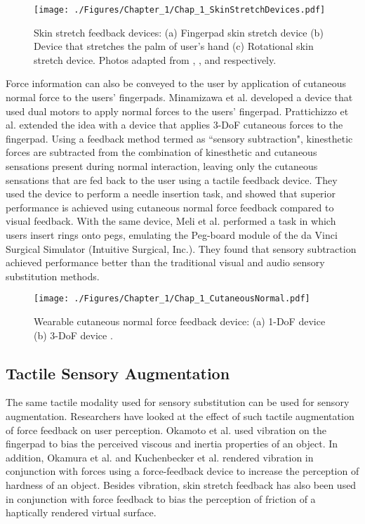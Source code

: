 \begin{figure*}[h]
\centering
\texttt{[image: ./Figures/Chapter\_1/Chap\_1\_SkinStretchDevices.pdf]}
\caption{\small Skin stretch feedback devices: (a) Fingerpad skin stretch device (b) Device that stretches the palm of user's hand (c) Rotational skin stretch device. Photos adapted from \cite{Guinan2012}, \cite{Guinan2014}, and \cite{Bark2010} respectively.}
\label{fig:Chap_1_SkinStretchDevices}
\end{figure*}

Force information can also be conveyed to the user by application of cutaneous normal force to the users' fingerpads. Minamizawa et al. \cite{Minamizawa2010} developed a device that used dual motors to apply normal forces to the users' fingerpad. Prattichizzo et al. \cite{Prattichizzo2012} extended the idea with a device that applies 3-DoF cutaneous forces to the fingerpad. Using a feedback method termed as ``sensory subtraction", kinesthetic forces are subtracted from the combination of kinesthetic and cutaneous sensations present during normal interaction, leaving only the cutaneous sensations that are fed back to the user using a tactile feedback device. They used the device to perform a needle insertion task, and showed that superior performance is achieved using cutaneous normal force feedback compared to visual feedback. With the same device, Meli et al. \cite{Meli2014} performed a task in which users insert rings onto pegs, emulating the Peg-board module of the da Vinci Surgical Simulator (Intuitive Surgical, Inc.). They found that sensory subtraction achieved performance better than the traditional visual and audio sensory substitution methods. 

\begin{figure*}[h]
\centering
\texttt{[image: ./Figures/Chapter\_1/Chap\_1\_CutaneousNormal.pdf]}
\caption{\small Wearable cutaneous normal force feedback device: (a) 1-DoF device (b) 3-DoF device .}
\label{fig:Chap_1_CutaneousNormal}
\end{figure*}

\subsection{Tactile Sensory Augmentation}
The same tactile modality used for sensory substitution can be used for sensory augmentation. Researchers have looked at the effect of such tactile augmentation of force feedback on user perception. Okamoto et al. \cite{Okamoto2011} used vibration on the fingerpad to bias the perceived viscous and inertia properties of an object. In addition, Okamura et al. \cite{Okamura2001} and Kuchenbecker et al. \cite{Kuchenbecker2006} rendered vibration in conjunction with forces using a force-feedback device to increase the perception of hardness of an object. Besides vibration, skin stretch feedback has also been used in conjunction with force feedback to bias the perception of friction \cite{Provancher2009} of a haptically rendered virtual surface.

